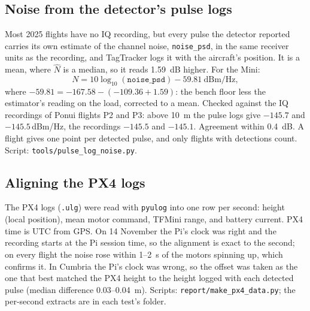 \documentclass[11pt]{article}
\newcommand{\dBmHz}{\,dBm/Hz}
\begin{document}
\subsection{Noise from the detector's pulse logs}
\label{sec:pulselogs}
Most 2025 flights have no IQ recording, but every pulse the detector reported carries its own
estimate of the channel noise, \texttt{noise\_psd}, in the same receiver units as the recording, and
TagTracker logs it with the aircraft's position. It is a mean, where $\hat N$ is a median, so it reads
1.59~dB higher. For the Mini:
\begin{equation}
N = 10\log_{10}(\texttt{noise\_psd}) - 59.81\ \text{dBm/Hz},
\end{equation}
where $-59.81 = -167.58 - (-109.36 + 1.59)$: the bench floor less the estimator's reading on the
load, corrected to a mean. Checked against the IQ recordings of Ponui flights P2 and P3: above 10~m
the pulse logs give $-145.7$ and $-145.5$\dBmHz, the recordings $-145.5$ and $-145.1$. Agreement
within 0.4~dB. A flight gives one point per detected pulse, and only flights with detections count.
Script: \texttt{tools/pulse\_log\_noise.py}.

\subsection{Aligning the PX4 logs}
\label{sec:px4method}
The PX4 logs (\texttt{.ulg}) were read with \texttt{pyulog} into one row per second: height
(local position), mean motor command, TFMini range, and battery current. PX4 time is UTC from GPS. On
14 November the Pi's clock was right and the recording starts at the Pi session time, so the alignment
is exact to the second; on every flight the noise rose within 1--2~s of the motors spinning up, which
confirms it. In Cumbria the Pi's clock was wrong, so the offset was taken as the one that best matched
the PX4 height to the height logged with each detected pulse (median difference 0.03--0.04~m). Scripts:
\texttt{report/make\_px4\_data.py}; the per-second extracts are in each test's folder.
\end{document}

